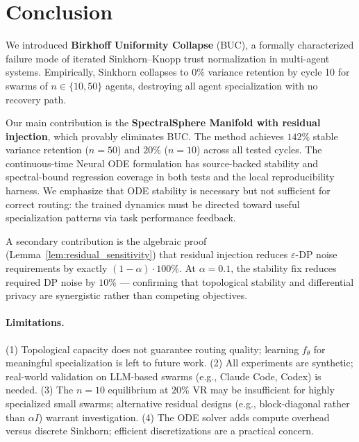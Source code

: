 \section{Conclusion}
\label{sec:conclusion}

We introduced \textbf{Birkhoff Uniformity Collapse} (BUC), a formally characterized
failure mode of iterated Sinkhorn--Knopp trust normalization in multi-agent systems.
Empirically, Sinkhorn collapses to $0\%$ variance retention by cycle 10 for swarms of
$n \in \{10, 50\}$ agents, destroying all agent specialization with no recovery path.

Our main contribution is the \textbf{SpectralSphere Manifold with residual injection},
which provably eliminates BUC.  The method achieves $142\%$ stable variance retention
($n{=}50$) and $20\%$ ($n{=}10$) across all tested cycles.  The continuous-time Neural
ODE formulation has source-backed stability and spectral-bound regression coverage in
both tests and the local reproducibility harness.  We emphasize that ODE stability is
necessary but not sufficient for correct routing: the trained dynamics must be directed
toward useful specialization patterns via task performance feedback.

A secondary contribution is the algebraic proof (Lemma~\ref{lem:residual_sensitivity})
that residual injection reduces $\varepsilon$-DP noise requirements by exactly
$(1-\alpha) \cdot 100\%$.  At $\alpha{=}0.1$, the stability fix reduces required DP
noise by $10\%$ — confirming that topological stability and differential privacy are
synergistic rather than competing objectives.

\paragraph{Limitations.}
(1) Topological capacity does not guarantee routing quality; learning $f_\theta$ for
meaningful specialization is left to future work.
(2) All experiments are synthetic; real-world validation on LLM-based swarms
(e.g., Claude Code, Codex) is needed.
(3) The $n{=}10$ equilibrium at $20\%$ VR may be insufficient for highly specialized
small swarms; alternative residual designs (e.g., block-diagonal rather than $\alpha I$)
warrant investigation.
(4) The ODE solver adds compute overhead versus discrete Sinkhorn; efficient
discretizations are a practical concern.

